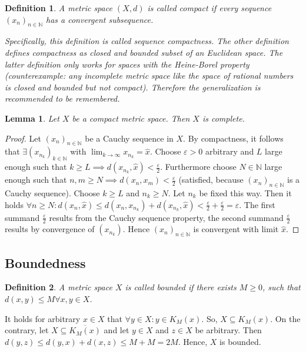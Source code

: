 \documentclass{article}
\newtheorem{definition}{Definition}  \numberwithin{definition}{section}
\newtheorem{lemma}{Lemma}  \numberwithin{lemma}{section}
\begin{document}
\begin{definition} %
  A metric space $(X, d)$ is called \emph{compact} if every sequence $(x_n)_{n \in \mathbb N}$
  has a convergent subsequence.

  Specifically, this definition is called sequence compactness. The other definition defines compactness as closed and bounded subset of an Euclidean space. The latter definition only works for \emph{spaces with the Heine-Borel property} (counterexample: any incomplete metric space like the space of rational numbers is closed and bounded but not compact). Therefore the generalization is recommended to be remembered.
\end{definition}

\begin{lemma} %
  Let $X$ be a compact metric space. Then $X$ is complete.
\end{lemma}
\begin{proof}
  Let $(x_n)_{n\in\mathbb N}$ be a Cauchy sequence in $X$. By compactness, it follows that
  $\exists (x_{n_k})_{k \in \mathbb N}$ with $\lim_{k\to\infty} x_{n_k} = \hat{x}$.
  Choose $\varepsilon > 0$ arbitrary and $L$ large enough such that $k \geq L \implies d(x_{n_k}, \hat{x}) < \frac\varepsilon2$. Furthermore choose $N \in \mathbb N$ large enough such that $n,m \geq N \implies d(x_n, x_m) < \frac\varepsilon2$ (satisfied, because $(x_n)_{n \in \mathbb N}$ is a Cauchy sequence).
  Choose $k \geq L$ and $n_k \geq N$. Let $n_k$ be fixed this way.
  Then it holds $\forall n \geq N: d(x_n, \hat{x}) \leq d(x_n, x_{n_k}) + d(x_{n_k}, \hat{x}) < \frac\varepsilon2 + \frac\varepsilon2 = \varepsilon$. The first summand $\frac\varepsilon2$ results from the Cauchy sequence property, the second summand $\frac\varepsilon2$ results by convergence of $(x_{n_k})$. Hence $(x_n)_{n\in\mathbb N}$ is convergent with limit $\hat{x}$.
\end{proof}

\subsection{Boundedness}
\begin{definition} %
  A metric space $X$ is called \emph{bounded} if there exists $M \geq 0$, such that $d(x,y) \leq M \forall x,y \in X$.
\end{definition}
It holds for arbitrary $x \in X$ that $\forall y \in X: y \in K_M(x)$.
So, $X \subseteq K_M(x)$.
On the contrary, let $X \subseteq \overline{K_M(x)}$ and let $y \in X$ and $z \in X$ be arbitrary. Then $d(y, z) \leq d(y, x) + d(x, z) \leq M + M = 2M$. Hence, $X$ is bounded.
\end{document}

